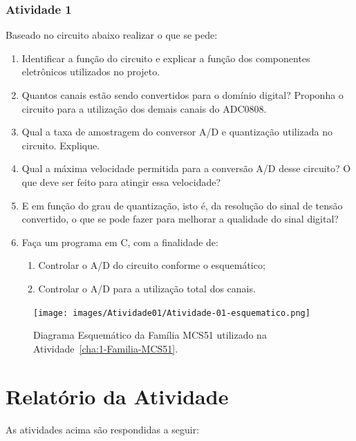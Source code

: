 \documentclass[
	12pt,				%
	openright,			%
  oneside,     %
	a4paper,			%
	english,			%
	french,				%
	spanish,			%
	brazil				%
	]{abntex2}
\begin{document}
\subsubsection*{Atividade 1}

\noindent Baseado no circuito abaixo realizar o que se pede:

\begin{enumerate}
  \item Identificar a função do circuito e explicar a função dos componentes eletrônicos utilizados no projeto.
  \item Quantos canais estão sendo convertidos para o domínio digital? Proponha o circuito para a utilização dos demais canais do ADC0808.
  \item Qual a taxa de amostragem do conversor A/D e quantização utilizada no circuito. Explique.
  \item Qual a máxima velocidade permitida para a conversão A/D desse circuito? O que deve ser feito para atingir essa velocidade?
  \item E em função do grau de quantização, isto é, da resolução do sinal de tensão convertido, o que se pode fazer para melhorar a qualidade do sinal digital?
  \item Faça um programa em C, com a finalidade de:
  \begin{enumerate}
    \item Controlar o A/D do circuito conforme o esquemático;
    \item Controlar o A/D para a utilização total dos canais.
  \end{enumerate}
\end{enumerate}

\begin{figure}[ht]
  \centering
  \caption{\label{fig:Atividade-01-esquematico.png}Diagrama Esquemático da Família MCS51 utilizado na Atividade~\ref{cha:1-Familia-MCS51}.}
  \texttt{[image: images/Atividade01/Atividade-01-esquematico.png]}
\end{figure}

\section{Relatório da Atividade} %
\label{sec:consideracoes-cap-1}

\noindent As atividades acima são respondidas a seguir:
\end{document}
